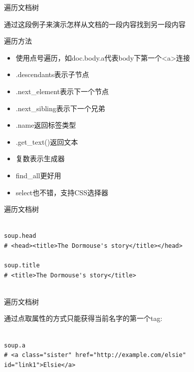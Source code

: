 \documentclass{beamer}
\begin{document}
\begin{frame}[t]{遍历文档树}

通过这段例子来演示怎样从文档的一段内容找到另一段内容

\begin{block}
    {遍历方法}
    \begin{itemize}
        \item 使用点号遍历，如doc.body.a代表body下第一个<a>连接
        \item .descendants表示子节点
        \item .next\_element表示下一个节点
        \item .next\_sibling表示下一个兄弟
        \item .name返回标签类型
        \item .get\_text()返回文本
        \item 复数表示生成器
        \item find\_all更好用
        \item select也不错，支持CSS选择器
    \end{itemize}
\end{block}

\end{frame}


\begin{frame}[t,fragile]{遍历文档树}


\begin{verbatim}

soup.head
# <head><title>The Dormouse's story</title></head>

soup.title
# <title>The Dormouse's story</title>


\end{verbatim}


\end{frame}



\begin{frame}[t,fragile]{遍历文档树}

通过点取属性的方式只能获得当前名字的第一个tag:

\begin{verbatim}

soup.a
# <a class="sister" href="http://example.com/elsie" id="link1">Elsie</a>


\end{verbatim}


\end{frame}
\end{document}
